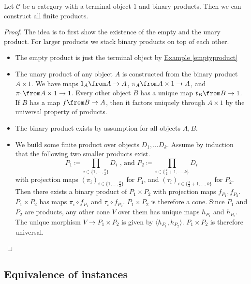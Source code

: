 \begin{lemma}
  \label{finiteproducts}
  Let $\mathscr C$ be a category with a terminal object $1$ and binary products.
  Then we can construct all finite products.
\end{lemma}
\begin{proof}
  The idea is to first show the existence of the empty and the unary product.
  For larger products we stack binary products on top of each other.
  \begin{itemize}
  \item The empty product is just the terminal object by
    \hyperref[emptyproduct]{Example \ref*{emptyproduct}}
  \item The unary product of any object $A$ is constructed from the binary product
    $A \times 1$.
    We have maps $1_A \from A \to A$, $\pi_A \from A \times 1 \to A$, and $\pi_1 \from A \times 1 \to 1$.
    Every other object $B$ has a unique map $t_B \from B \to 1$. If $B$ has a map $f \from B \to A$, then
    it factors uniquely through $A \times 1$ by the universal property of products.
  \item The binary product exists by assumption for all objects $A, B$.
  \item We build some finite product over objects $D_1, \dots D_k$.
    Assume by induction that the following two smaller products exist.
    \[ P_1 \coloneqq \displaystyle \prod_{i \in \{1, \dots, \frac{k}{2} \} } D_i \text{ , and } P_2 \coloneqq \displaystyle \prod_{i \in \{\frac{k}{2} + 1, \dots, k\} } D_i \]
    with projection maps $(\pi_i)_{i \in \{1, \dots, \frac{k}{2} \} }$ for $P_1$, and $(\tau_i)_{i \in \{\frac{k}{2}+1, \dots, k\} }$ for $P_2$.
    Then there exists a binary product of $P_1 \times P_2$ with projection maps $f_{P_1}, f_{P_2}$.
    $P_1 \times P_2$ has maps $\pi_i \circ f_{P_1}$ and $\tau_i \circ f_{P_2}$.
    $P_1 \times P_2$ is therefore a cone.
    Since $P_1$ and $P_2$ are products, any other cone $V$ over them has unique maps $h_{P_1}$ and $h_{P_2}$.
    The unique morphism $V \rightarrow P_1 \times P_2$ is given by $\langle h_{P_1}, h_{P_2} \rangle$.
    $P_1 \times P_2$ is therefore universal.
  \end{itemize}
\end{proof}

\subsection{Equivalence of instances}
\label{equiinstance}

